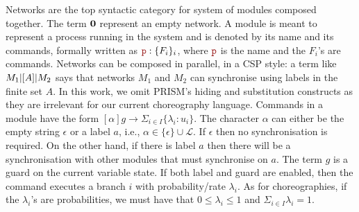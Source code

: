 Networks are the top syntactic category for system of modules composed
together. The term $\mathbf{0}$ represent an empty network. A module is
meant to represent a process running in the system and is denoted by
its name and its commands, formally written as $\role{p}:\{F_i\}_i$,
where $\role p$ is the name and the $F_i$'s are commands. Networks can
be composed in parallel, in a CSP style: a term like $M_1 |[A]| M_2$
says that networks $M_1$ and $M_2$ can synchronise using labels in the
finite set $A$.
%
In this work, we omit PRISM's hiding and substitution constructs as
they are irrelevant for our current choreography language.
%
Commands in a module have the form
$[\alpha] g \rightarrow \Sigma_{i\in I}\{\lambda_i: u_i\}$. The
character $\alpha$ can either be the empty string $\epsilon$ or a
label $a$, i.e., $\alpha\in\{\epsilon\}\cup \mathcal L$. If $\epsilon$
then no synchronisation is required. On the other hand, if there is
label $a$ then there will be a synchronisation with other modules that
must synchronise on $a$. The term $g$ is a guard on the current
variable state. If both label and guard are enabled, then the command
executes a branch $i$ with probability/rate $\lambda_i$. As for
choreographies, if the $\lambda_i$'s are probabilities, we must have
that $0\leq\lambda_i\leq 1$ and $\Sigma_{i\in I}\lambda_i=1$.


